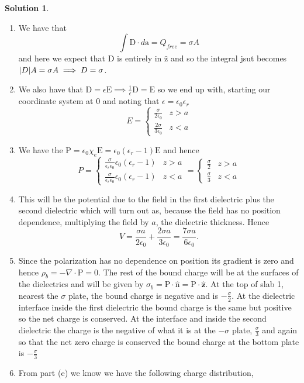 \documentclass[10pt]{article}
\theoremstyle{definition}
\newtheorem{soln}{Solution}
\newcommand{\uz}{\hat{\mathbf{z}}}
\newcommand{\uv}[1]{\hat{\bv{{#1}}}}
\newcommand{\bv}[1]{\bm{\mathrm{#1}}}
\begin{document}
\begin{soln}~
  \begin{enumerate}[label=(\alph*)]
    \item We have that $$\int \bv{D}\cdot d\bv{a}=Q_{free}=\sigma A$$ and here we expect that
          $\bv{D}$ is entirely in $\uv{z}$ and so the integral jsut becomes $\abs{D}A=\sigma A\implies D=\sigma$.
    \item We also have that $\bv{D}=\epsilon \bv{E}\implies \frac{1}{\epsilon}\bv{D}=\bv{E}$ so we end up with, starting our coordinate system at
          0 and noting that $\epsilon=\epsilon_0\epsilon_r$
          $$
            E=\begin{cases}
              \frac{\sigma}{2\epsilon_0}  & z > a \\
              \frac{2\sigma}{3\epsilon_0} & z < a
            \end{cases}
          $$
    \item We have the $\bv{P}=\epsilon_0\chi_e\bv{E}=\epsilon_0(\epsilon_r-1)\bv{E}$ and hence
          $$
            P=\begin{cases}
              \frac{\sigma}{\epsilon_r\epsilon_0}\epsilon_0(\epsilon_r-1) & z > a \\
              \frac{\sigma}{\epsilon_r\epsilon_0}\epsilon_0(\epsilon_r-1) & z < a
            \end{cases}=
            \begin{cases}
              \frac{\sigma}{2} & z > a \\
              \frac{\sigma}{3} & z < a
            \end{cases}
          $$
    \item This will be the potential due to the field in the first dielectric plus the second dielectric which will turn out as, because the field has no
          position dependence, multiplying the field by $a$, the dielectric thickness. Hence
          $$V=\frac{\sigma a}{2\epsilon_0}+\frac{2\sigma a}{3\epsilon_0}=\frac{7\sigma a}{6\epsilon_0}.$$
    \item Since the polarization has no dependence on position its gradient is zero and hence $\rho_b=-\nabla\cdot \bv{P}=0$. The rest of the bound charge will be at the surfaces
          of the dielectrics and will be given by $\sigma_b=\bv{P}\cdot\uv{n}=\bv{P}\cdot\uz$. At the top of slab 1, nearest the $\sigma$ plate, the bound charge is negative and is
          $-\frac{\sigma}{2}$. At the dielectric interface inside the first dielectric the bound charge is the same but positive so the net charge is conserved. At the interface and inside the
          second dielectric the charge is the negative of what it is at the $-\sigma$ plate, $\frac{\sigma}{3}$ and again so that the net zero charge is conserved the bound charge
          at the bottom plate is $-\frac{\sigma}{3}$
    \item From part (e) we know we have the following charge distribution,
          \begin{center}
\end{center}
\end{enumerate}
\end{soln}
\end{document}
